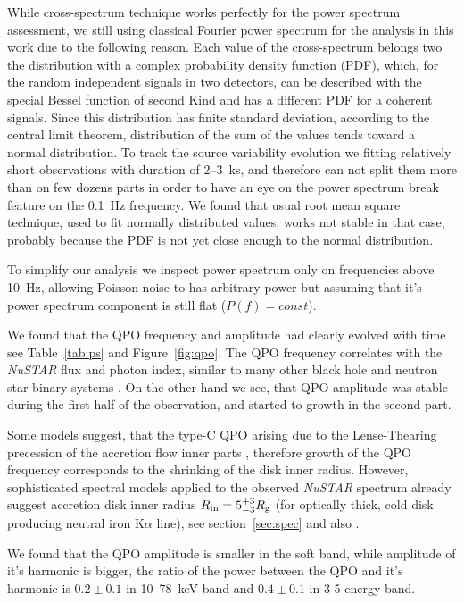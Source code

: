 \documentclass[a4paper,fleqn,usenatbib]{mnras}
\begin{document}
\begin{table}
While cross-spectrum technique works perfectly for the power spectrum assessment, we still using classical Fourier power spectrum for the analysis in this work due to the following reason.
Each value of the cross-spectrum belongs two the distribution with a complex probability density function (PDF), which,  for the random independent signals in two detectors, can be described with the special Bessel function of second Kind and has a different PDF for a coherent signals. 
Since this distribution has finite standard deviation, according to the central limit theorem, distribution of the sum of the values tends toward a normal distribution.
To track the source variability evolution we fitting relatively short observations with duration of 2--3~ks, and therefore can not split them more than on few dozens parts in order to have an eye on the power spectrum break feature on the 0.1~Hz frequency. 
We found that usual root mean square technique, used to fit normally distributed values, works not stable in that case, probably because the PDF is not yet close enough to the normal distribution. 

To simplify our analysis we inspect power spectrum only on frequencies above 10~Hz, allowing Poisson noise to has arbitrary power but assuming that it's power spectrum component is still flat ($P(f) = const$).

We found that the QPO frequency and amplitude had clearly evolved with time see Table~\ref{tab:ps} and Figure~\ref{fig:qpo}.
The QPO frequency correlates with the {\it NuSTAR} flux and photon index, similar to many other black hole and neutron star binary systems \citep{2003A&A...397..729V,2003A&A...407.1039P}.
On the other hand we see, that QPO amplitude was stable during the first half of the observation, and started to growth in the second part.

Some models suggest, that the type-C QPO arising due to the Lense-Thearing precession of the accretion flow inner parts \citep{1998ApJ...492L..59S, 2006ApJ...642..420S, 2009MNRAS.397L.101I}, therefore growth of the QPO frequency corresponds to the shrinking of the disk inner radius.
However, sophisticated spectral models applied to the observed {\it NuSTAR} spectrum already suggest accretion disk inner radius $R_{\rm in}= 5_{-3}^{+3}R_{\rm g}$ (for optically thick, cold disk producing neutral iron K$\alpha$ line), see section~\ref{sec:spec} and also \citep{miller15_nust}.

We found that the QPO amplitude is smaller in the soft band, while amplitude of it's harmonic is bigger, the ratio of the power between the QPO and it's harmonic is $0.2\pm0.1$ in 10--78~keV band and $0.4\pm0.1$ in 3-5 energy band.


\end{table}
\end{document}
